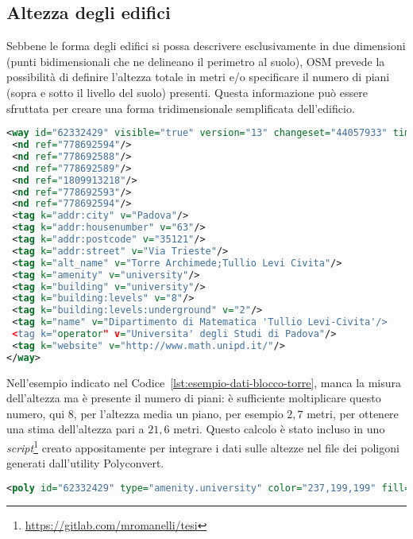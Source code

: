 \subsection{Altezza degli edifici}\label{subsec:altezza-edifici}
Sebbene le forma degli edifici si possa descrivere esclusivamente in due dimensioni (punti bidimensionali che ne delineano il perimetro al suolo),
OSM prevede la possibilità di definire l'altezza totale in metri e/o specificare il numero di piani (sopra e sotto il livello del suolo)
presenti.
Questa informazione può essere sfruttata per creare una forma tridimensionale semplificata dell'edificio.
%
\begin{lstlisting}[language=XML,style=mystyle,numbers=none,label={lst:esempio-dati-blocco-torre},caption={Esempio di informazioni di un edificio estratte da OSM.}]
<way id="62332429" visible="true" version="13" changeset="44057933" timestamp="2016-11-30T11:53:34Z" user="Agno-phi" uid="731498" >
 <nd ref="778692594"/>
 <nd ref="778692588"/>
 <nd ref="778692589"/>
 <nd ref="1809913218"/>
 <nd ref="778692593"/>
 <nd ref="778692594"/>
 <tag k="addr:city" v="Padova"/>
 <tag k="addr:housenumber" v="63"/>
 <tag k="addr:postcode" v="35121"/>
 <tag k="addr:street" v="Via Trieste"/>
 <tag k="alt_name" v="Torre Archimede;Tullio Levi Civita"/>
 <tag k="amenity" v="university"/>
 <tag k="building" v="university"/>
 <tag k="building:levels" v="8"/>
 <tag k="building:levels:underground" v="2"/>
 <tag k="name" v="Dipartimento di Matematica 'Tullio Levi-Civita'/>
 <tag k="operator" v="Universita' degli Studi di Padova"/>
 <tag k="website" v="http://www.math.unipd.it/"/>
</way>
\end{lstlisting}
%
Nell'esempio indicato nel Codice~\ref{lst:esempio-dati-blocco-torre}, manca la misura dell'altezza ma è presente
il numero di piani: è sufficiente moltiplicare questo numero, qui $8$, per l'altezza media un piano, per esempio $2,7$ metri,
per ottenere una stima dell'altezza pari a $21,6$ metri.
Questo calcolo è stato incluso in uno \textit{script}\footnote{\url{https://gitlab.com/mromanelli/tesi}} creato appositamente per integrare i dati sulle altezze nel file
dei poligoni generati dall'utility Polyconvert.
%
\begin{lstlisting}[language=XML,style=mystyle,numbers=none,linewidth=\textwidth,label={lst:esempio-poly-blocco-torre},caption={Forma di un edificio estratta da OSM e convertita con Polyconvert con l'aggiunta dell'altezza.}]
<poly id="62332429" type="amenity.university" color="237,199,199" fill="1" layer="-1.00" height="21.6" shape="79.68,73.38 119.66,61.39 108.52,24.49 88.84,30.39 68.53,36.48 79.68,73.38" />
\end{lstlisting}
%
%
